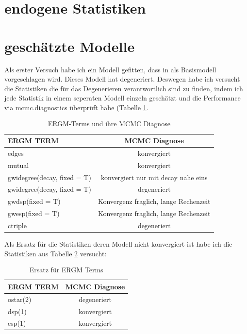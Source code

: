 \documentclass[a4paper,ngerman,oneside,titlepage,bibliography=totoc,11pt]{scrreprt}
\begin{document}
\section{endogene Statistiken}
\section{geschätzte Modelle}
Als erster Versuch habe ich ein Modell gefitten, dass in \cite{lkr12} als Basismodell vorgeschlagen wird. Dieses Modell hat degeneriert. Deswegen habe ich versucht die Statistiken die für das Degenerieren verantwortlich sind zu finden, indem ich jede Statistik in einem seperaten Modell einzeln geschätzt und die Performance via mcmc.diagnostics überprüft habe (Tabelle \ref{tab:ergmrobins}.


\begin{table}[h]
	\centering
		\begin{tabular}{l|c}
		\hline 
		ERGM TERM 									& MCMC Diagnose\\
		\hline
		edges 											& konvergiert\\
		mutual 											& konvergiert\\
		gwidegree(decay, fixed = T)	& konvergiert nur mit decay nahe eins\\
		gwidegree(decay, fixed = T)	& degeneriert\\
		gwdsp(fixed = T)						& Konvergenz fraglich, lange Rechenzeit\\
		gwesp(fixed = T)						& Konvergenz fraglich, lange Rechenzeit\\
		ctriple 										& degeneriert\\
		\hline
		\end{tabular}
	\caption{ERGM-Terms und ihre MCMC Diagnose}
	\label{tab:ergmrobins}
\end{table}

Als Ersatz für die Statistiken deren Modell nicht konvergiert ist  habe ich die Statistiken aus Tabelle \ref{tab:ergmrobinsersatz} versucht:

\begin{table}[h]
	\centering
		\begin{tabular}{l|c}
		\hline 
		ERGM TERM 									& MCMC Diagnose\\
		\hline
		ostar(2)										& degeneriert\\
		dsp(1)											& konvergiert\\
		esp(1)											& konvergiert\\
			\hline
		\end{tabular}
	\caption{Ersatz für ERGM Terms}
	\label{tab:ergmrobinsersatz}
\end{table}
 
\end{document}
